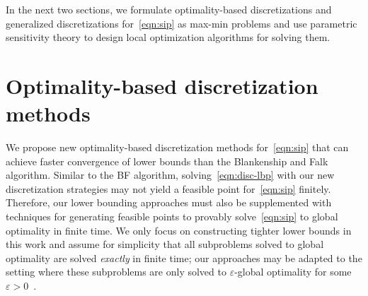 \documentclass{article}
\newcommand{\1}[1]{\mathds{1}\left[#1\right]}
\begin{document}
In the next two sections, we formulate optimality-based discretizations and generalized discretizations for~\eqref{eqn:sip} as max-min problems and use parametric sensitivity theory to design local optimization algorithms for solving them.




\section{Optimality-based discretization methods}
\label{sec:accelerated_discretization}



We propose new optimality-based discretization methods for~\eqref{eqn:sip} that can achieve faster convergence of lower bounds than the Blankenship and Falk algorithm. 
Similar to the BF algorithm, solving~\eqref{eqn:disc-lbp} with our new discretization strategies may not yield a feasible point for~\eqref{eqn:sip} finitely.
Therefore, our lower bounding approaches must also be supplemented with techniques for generating feasible points to provably solve~\eqref{eqn:sip} to global optimality in finite time. 
We only focus on constructing tighter lower bounds in this work and assume for simplicity that all subproblems solved to global optimality are solved \textit{exactly} in finite time; our approaches may be adapted to the setting where these subproblems are only solved to $\varepsilon$-global optimality for some $\varepsilon > 0$~\cite{djelassi2017hybrid,djelassi2020discretization,harwood2021note}. 
\end{document}
